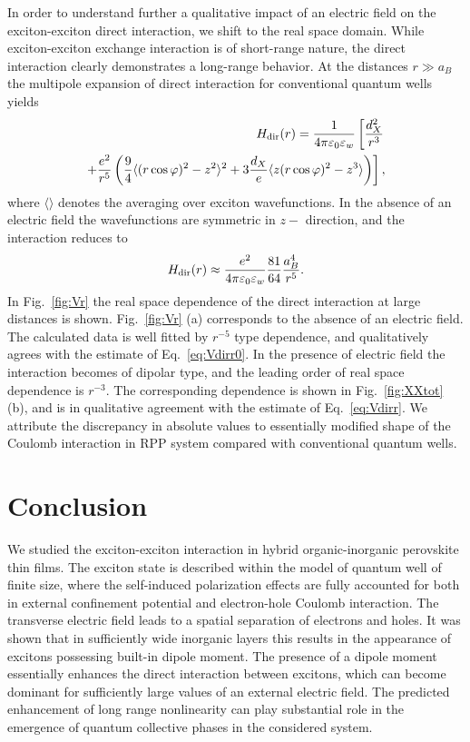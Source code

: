 \documentclass[prb,twocolumn,preprintnumbers,superscriptaddress]{revtex4}
\begin{document}
In order to understand further a qualitative impact of an electric field on the exciton-exciton direct interaction, we shift to the real space domain.
While exciton-exciton exchange interaction is of short-range nature, the direct interaction clearly demonstrates a long-range behavior.
At the distances $r \gg a_B$ the multipole expansion of direct interaction for conventional quantum wells yields \cite{Schindler2008}
%
\begin{align}
    \label{eq:Vdirr}
    H_{\rm dir}(r) = \frac{1}{4\pi\varepsilon_0\varepsilon_w} 
    \left[ \frac{d_X^2}{r^3} \right. \notag \\
    \left. + \frac{e^2}{r^5} \left( \frac{9}{4} \langle (r\cos\varphi)^2 - z^2 \rangle^2 
    +3 \frac{d_X}{e}  \langle z (r\cos\varphi)^2 - z^3 \rangle  \right)\right] ,
\end{align}
%
where $\langle\rangle$ denotes the averaging over exciton wavefunctions. In the absence of an electric field the wavefunctions are symmetric in $z-$ direction, and the interaction reduces to
%
\begin{equation}
    \label{eq:Vdirr0}
     H_{\rm dir}(r) \approx \frac{e^2}{4\pi\varepsilon_0\varepsilon_w} 
\frac{81}{64} \frac{a_B^4}{r^5} .
\end{equation}
%
In Fig.~\ref{fig:Vr} the real space dependence of the direct interaction at large distances is shown. Fig.~\ref{fig:Vr} (a) corresponds to the absence of an electric field.
The calculated data is well fitted by $r^{-5}$ type dependence, and qualitatively agrees  with the estimate of Eq.~\eqref{eq:Vdirr0}. 
In the presence of electric field the interaction becomes of dipolar type, and the leading order of real space dependence is $r^{-3}$. 
The corresponding dependence is shown in Fig.~\ref{fig:XXtot} (b), and is in qualitative agreement with the estimate of Eq.~\eqref{eq:Vdirr}. We attribute the discrepancy in absolute values to essentially modified shape of the Coulomb interaction in RPP system compared with conventional quantum wells.

\section{Conclusion}\label{sec:conc}

We studied the exciton-exciton interaction in hybrid organic-inorganic perovskite thin films. The exciton state is described within the model of quantum well of finite size, where the self-induced polarization effects are fully accounted for both in external confinement potential and electron-hole Coulomb interaction. The transverse electric field leads to a spatial separation of electrons and holes. It was shown that in sufficiently wide inorganic layers this results in the appearance of excitons possessing built-in dipole moment. The presence of a dipole moment essentially enhances the direct interaction between excitons, which can become dominant for sufficiently large values of an external electric field. The predicted enhancement of long range nonlinearity can play substantial role in the emergence of quantum collective phases in the considered system.
\end{document}
